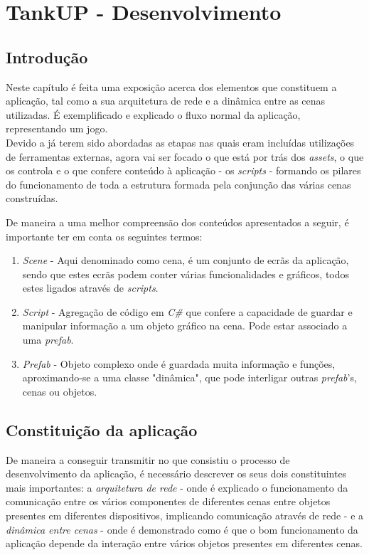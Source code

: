 \chapter{TankUP - Desenvolvimento}
\label{chap:desen}

\section{Introdução}
\label{chap4:sec:intro}
Neste capítulo é feita uma exposição acerca dos elementos que constituem a aplicação, tal como a sua arquitetura de rede e a dinâmica entre as cenas utilizadas. É exemplificado e explicado o fluxo normal da aplicação, representando um jogo. \\ 
Devido a já terem sido abordadas as etapas nas quais eram incluídas utilizações de ferramentas externas, agora vai ser focado o que está por trás dos \textit{assets}, o que os controla e o que confere conteúdo à aplicação - os \emph{scripts} - formando os pilares do funcionamento de toda a estrutura formada pela conjunção das várias cenas construídas.

De maneira a uma melhor compreensão dos conteúdos apresentados a seguir, é importante ter em conta os seguintes termos: 
\begin{enumerate}
    \item \textit{Scene} - Aqui denominado como cena, é um conjunto de ecrãs da aplicação, sendo que estes ecrãs podem conter várias funcionalidades e gráficos, todos estes ligados através de \textit{scripts}.
    \item \textit{Script} - Agregação de código em \emph{C\#} que confere a capacidade de guardar e manipular informação a um objeto gráfico na cena. Pode estar associado a uma \textit{prefab}.
    \item \textit{Prefab} - Objeto complexo onde é guardada muita informação e funções, aproximando-se a uma classe "dinâmica", que pode interligar outras \textit{prefab}'s, cenas ou objetos. 
\end{enumerate}


\section{Constituição da aplicação}
\label{chap4:sec:TG}
De maneira a conseguir transmitir no que consistiu o processo de desenvolvimento da aplicação, é necessário descrever os seus dois constituintes mais importantes: a \emph{arquitetura de rede} - onde é explicado o funcionamento da comunicação entre os vários componentes de diferentes cenas entre objetos presentes em diferentes dispositivos, implicando comunicação através de rede - e a \emph{dinâmica entre cenas} - onde é demonstrado como é que o bom funcionamento da aplicação depende da interação entre vários objetos presentes em diferentes cenas. \\

